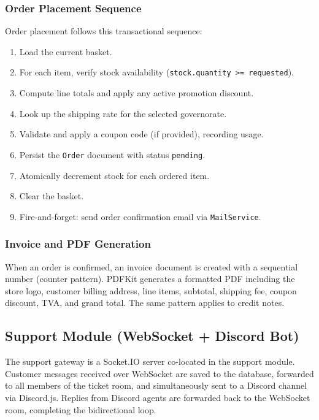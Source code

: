 \subsubsection{Order Placement Sequence}

Order placement follows this transactional sequence:

\begin{enumerate}
    \item Load the current basket.
    \item For each item, verify stock availability (\texttt{stock.quantity >= requested}).
    \item Compute line totals and apply any active promotion discount.
    \item Look up the shipping rate for the selected governorate.
    \item Validate and apply a coupon code (if provided), recording usage.
    \item Persist the \texttt{Order} document with status \texttt{pending}.
    \item Atomically decrement stock for each ordered item.
    \item Clear the basket.
    \item Fire-and-forget: send order confirmation email via \texttt{MailService}.
\end{enumerate}

\subsubsection{Invoice and PDF Generation}

When an order is confirmed, an invoice document is created with a sequential number
(counter pattern). PDFKit generates a formatted PDF including the store logo, customer
billing address, line items, subtotal, shipping fee, coupon discount, TVA, and grand
total. The same pattern applies to credit notes.

\subsection{Support Module (WebSocket + Discord Bot)}

The support gateway is a Socket.IO server co-located in the support module.
Customer messages received over WebSocket are saved to the database, forwarded to
all members of the ticket room, and simultaneously sent to a Discord channel via
Discord.js. Replies from Discord agents are forwarded back to the WebSocket room,
completing the bidirectional loop.

